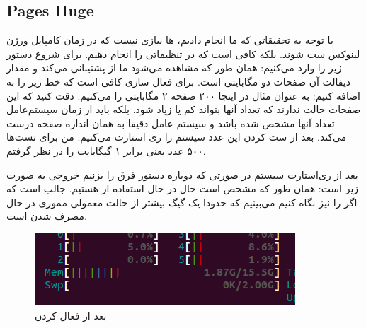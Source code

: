 \subsection{Pages Huge}
با توجه به تحقیقاتی که ما انجام دادیم،
ها
نیازی نیست که در زمان کامپایل ورژن لینوکس ست شوند. بلکه کافی است که در
تنظیماتی را انجام دهیم. برای شروع دستور زیر را وارد می‌کنیم:
همان طور که مشاهده می‌شود
ما از
پشتیبانی می‌کند و مقدار دیفالت آن صفحات دو مگابایتی است. برای فعال سازی
کافی است که خط زیر را به
اضافه کنیم:
به عنوان مثال در اینجا ۲۰۰ صفحه ۲ مگابایتی را
می‌کنیم. دقت کنید که این صفحات حالت 
ندارند که تعداد آنها بتواند کم یا زیاد شود. بلکه باید از زمان
سیستم‌عامل تعداد آنها مشخص شده باشد و سیستم عامل دقیقا به همان اندازه صفحه درست می‌کند.
بعد از ست کردن این عدد سیستم را ری استارت می‌کنیم. من برای تست‌ها ۵۰۰ عدد یعنی برابر ۱ گیگابایت
را در نظر گرفتم.

بعد از ری‌استارت سیستم در صورتی که دوباره دستور فرق را بزنیم خروجی به صورت زیر است:
همان طور که مشخص است حال در حال استفاده از
هستیم. جالب است که اگر
را نیز نگاه کنیم می‌بینیم که حدودا یک گیگ بیشتر از حالت معمولی مموری در حال مصرف شدن است.
\begin{figure}[H]
    \centering
    \includegraphics[scale=0.75]{pictures/intro/hugepages-htop.png}
    \caption{ بعد از فعال کردن }
    \label{fig:into:hugepages:htop}
\end{figure}


